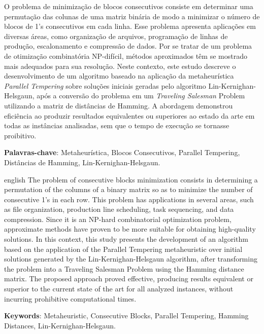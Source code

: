 \documentclass[
	12pt,				%
	openright,			%
	twoside,			%
	a4paper,			%
	english,			%
	french,				%
	spanish,			%
	brazil				%
	]{abntex2}
\begin{document}
\setlength{\absparsep}{18pt} %
\begin{resumo}[Resumo]
	O problema de minimização de blocos consecutivos consiste em determinar uma permutação das colunas de uma matriz binária de modo a minimizar o número de blocos de 1’s consecutivos em cada linha. Esse problema apresenta aplicações em diversas áreas, como organização de arquivos, programação de linhas de produção, escalonamento e compressão de dados. Por se tratar de um problema de otimização combinatória NP-difícil, métodos aproximados têm se mostrado mais adequados para sua resolução. Neste contexto, este estudo descreve o desenvolvimento de um algoritmo baseado na aplicação da metaheurística \textit{Parallel Tempering} sobre soluções iniciais geradas pelo algoritmo Lin-Kernighan-Helsgaun, após a conversão do problema em um \textit{Traveling Salesman} Problem utilizando a matriz de distâncias de Hamming. A abordagem demonstrou eficiência ao produzir resultados equivalentes ou superiores ao estado da arte em todas as instâncias analisadas, sem que o tempo de execução se tornasse proibitivo.

	\textbf{Palavras-chave}: Metaheurística, Blocos Consecutivos, Parallel Tempering, Distâncias de Hamming, Lin-Kernighan-Helsgaun.
\end{resumo}


\begin{resumo}[Abstract]
	\begin{otherlanguage*}{english}
		The problem of consecutive blocks minimization consists in determining a permutation of the columns of a binary matrix so as to minimize the number of consecutive 1’s in each row. This problem has applications in several areas, such as file organization, production line scheduling, task sequencing, and data compression. Since it is an NP-hard combinatorial optimization problem, approximate methods have proven to be more suitable for obtaining high-quality solutions. In this context, this study presents the development of an algorithm based on the application of the Parallel Tempering metaheuristic over initial solutions generated by the Lin-Kernighan-Helsgaun algorithm, after transforming the problem into a Traveling Salesman Problem using the Hamming distance matrix. The proposed approach proved effective, producing results equivalent or superior to the current state of the art for all analyzed instances, without incurring prohibitive computational times.

		\textbf{Keywords}: Metaheuristic, Consecutive Blocks, Parallel Tempering, Hamming Distances, Lin-Kernighan-Helsgaun.
	\end{otherlanguage*}
\end{resumo}
\end{document}
